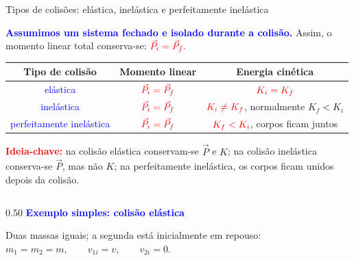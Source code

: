 \documentclass{beamer}
\begin{document}
	
	\begin{frame}{\large Tipos de colisões: elástica, inelástica e perfeitamente inelástica}
		\tiny
		
		\textcolor{blue}{\textbf{Assumimos um sistema fechado e isolado durante a colisão.}}
		Assim, o momento linear total conserva-se:
		$
		\textcolor{red}{\vec P_i=\vec P_f.}
		$
		
		\vspace{0.15cm}
		
		\begin{center}
			\renewcommand{\arraystretch}{1.35}
			\begin{tabular}{c|c|c}
				\textbf{Tipo de colisão} & \textbf{Momento linear} & \textbf{Energia cinética} \\ \hline
				\textcolor{blue}{elástica} &
				\(\textcolor{red}{\vec P_i=\vec P_f}\) &
				\(\textcolor{red}{K_i=K_f}\) \\[2pt]
				
				\textcolor{blue}{inelástica} &
				\(\textcolor{red}{\vec P_i=\vec P_f}\) &
				\(\textcolor{red}{K_i\neq K_f}\), normalmente \(K_f<K_i\) \\[2pt]
				
				\textcolor{blue}{perfeitamente inelástica} &
				\(\textcolor{red}{\vec P_i=\vec P_f}\) &
				\(\textcolor{red}{K_f<K_i}\), corpos ficam juntos
			\end{tabular}
		\end{center}
		
		\vspace{0.15cm}
		
		\textcolor{red}{\textbf{Ideia-chave:}}
		na colisão elástica conservam-se \(\vec P\) e \(K\); na colisão inelástica conserva-se \(\vec P\), mas não \(K\); na perfeitamente inelástica, os corpos ficam unidos depois da colisão.
		
		\vspace{0.15cm}
		
		\begin{columns}[T]
			\begin{column}{0.50\textwidth}
				\textcolor{blue}{\textbf{Exemplo simples: colisão elástica}}
				
				\vspace{0.1cm}
				
				Duas massas iguais; a segunda está inicialmente em repouso:
				$
				m_1=m_2=m,
				\qquad
				v_{1i}=v,
				\qquad
				v_{2i}=0.
				$
				\vspace{0.3cm}
				

\end{column}
\end{columns}
\end{frame}
\end{document}
